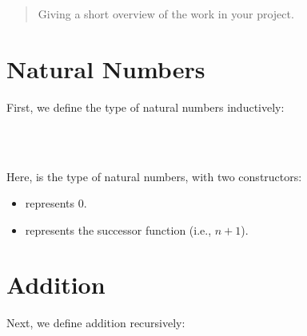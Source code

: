 

\begin{abstract}

Giving a short overview of the work in your project.\cite{ABBOTT20053}

\end{abstract}

\begin{code}%
\>[0]\AgdaSpace{}%
\AgdaSpace{}%
\<%
\end{code}

\section{Natural Numbers}
First, we define the type of natural numbers inductively:

\begin{code}%
\>[0]\AgdaSpace{}%
\AgdaSpace{}%
\AgdaSymbol{:}\AgdaSpace{}%
\AgdaSpace{}%
\<%
\\
\>[0][@{}l@{\AgdaIndent{0}}]%
\>[2]\AgdaSpace{}%
\AgdaSymbol{:}\AgdaSpace{}%
\<%
\\
%
\>[2]%
\>[7]\AgdaSymbol{:}\AgdaSpace{}%
\AgdaSpace{}%
\AgdaSpace{}%
\<%
\end{code}

Here,  is the type of natural numbers, with two constructors:
\begin{itemize}
  \item {} represents 0.
  \item {} represents the successor function (i.e., $n+1$).
\end{itemize}

\section{Addition}
Next, we define addition recursively:

\begin{code}%
\>[0]\AgdaOperator{\AgdaFunction{\AgdaUnderscore{}+\AgdaUnderscore{}}}\AgdaSpace{}%
\AgdaSymbol{:}\AgdaSpace{}%
\AgdaSpace{}%
\AgdaSpace{}%
\AgdaSpace{}%
\AgdaSpace{}%
\<%
\\
\>[0]%
\>[6]\AgdaOperator{\AgdaFunction{+}}\AgdaSpace{}%
\AgdaSpace{}%
\AgdaSymbol{=}\AgdaSpace{}%
\<%
\\
\>[0]\AgdaSpace{}%
\AgdaSpace{}%
\AgdaOperator{\AgdaFunction{+}}\AgdaSpace{}%
\AgdaSpace{}%
\AgdaSymbol{=}\AgdaSpace{}%
\AgdaSpace{}%
\AgdaSymbol{(}\AgdaSpace{}%
\AgdaOperator{\AgdaFunction{+}}\AgdaSpace{}%
\AgdaSymbol{)}\<%
\end{code}

